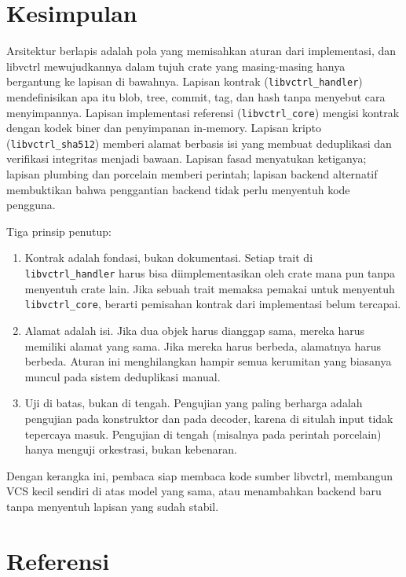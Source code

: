 \documentclass[11pt,a4paper]{article}
\begin{document}
\section{Kesimpulan}

Arsitektur berlapis adalah pola yang memisahkan aturan dari implementasi, dan libvctrl mewujudkannya dalam tujuh crate yang masing-masing hanya bergantung ke lapisan di bawahnya. Lapisan kontrak (\texttt{libvctrl\_handler}) mendefinisikan apa itu blob, tree, commit, tag, dan hash tanpa menyebut cara menyimpannya. Lapisan implementasi referensi (\texttt{libvctrl\_core}) mengisi kontrak dengan kodek biner dan penyimpanan in-memory. Lapisan kripto (\texttt{libvctrl\_sha512}) memberi alamat berbasis isi yang membuat deduplikasi dan verifikasi integritas menjadi bawaan. Lapisan fasad menyatukan ketiganya; lapisan plumbing dan porcelain memberi perintah; lapisan backend alternatif membuktikan bahwa penggantian backend tidak perlu menyentuh kode pengguna.

Tiga prinsip penutup:

\begin{enumerate}
	\item Kontrak adalah fondasi, bukan dokumentasi. Setiap trait di \texttt{libvctrl\_handler} harus bisa diimplementasikan oleh crate mana pun tanpa menyentuh crate lain. Jika sebuah trait memaksa pemakai untuk menyentuh \texttt{libvctrl\_core}, berarti pemisahan kontrak dari implementasi belum tercapai.
	\item Alamat adalah isi. Jika dua objek harus dianggap sama, mereka harus memiliki alamat yang sama. Jika mereka harus berbeda, alamatnya harus berbeda. Aturan ini menghilangkan hampir semua kerumitan yang biasanya muncul pada sistem deduplikasi manual.
	\item Uji di batas, bukan di tengah. Pengujian yang paling berharga adalah pengujian pada konstruktor dan pada decoder, karena di situlah input tidak tepercaya masuk. Pengujian di tengah (misalnya pada perintah porcelain) hanya menguji orkestrasi, bukan kebenaran.
\end{enumerate}

Dengan kerangka ini, pembaca siap membaca kode sumber libvctrl, membangun VCS kecil sendiri di atas model yang sama, atau menambahkan backend baru tanpa menyentuh lapisan yang sudah stabil.

\newpage
\section*{Referensi}
\end{document}

